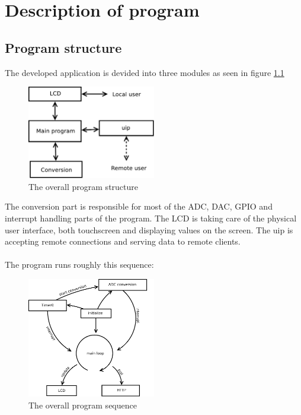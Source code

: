 \chapter[Description]{Description of program}
\label{chap:description}

\section{Program structure}
The developed application is devided into three modules as seen in figure \ref{fig:program_structure}

\begin{figure}[!h]
  \centering
  \label{fig:program_structure}
  \includegraphics[width=0.5\textwidth]{figs/program_structure.pdf}
  \caption{The overall program structure}
\end{figure}



The conversion part is responsible for most of the ADC, DAC, GPIO and interrupt handling parts of the program. The LCD is taking care of the physical user interface, both touchscreen and displaying values on the screen. The uip is accepting remote connections and serving data to remote clients.\\\\
The program runs roughly this sequence:

\begin{figure}[!h]
  \centering
  \label{fig:program_sequence}
  \includegraphics[width=0.5\textwidth]{figs/program_sequence.pdf}
  \caption{The overall program sequence}
\end{figure}

